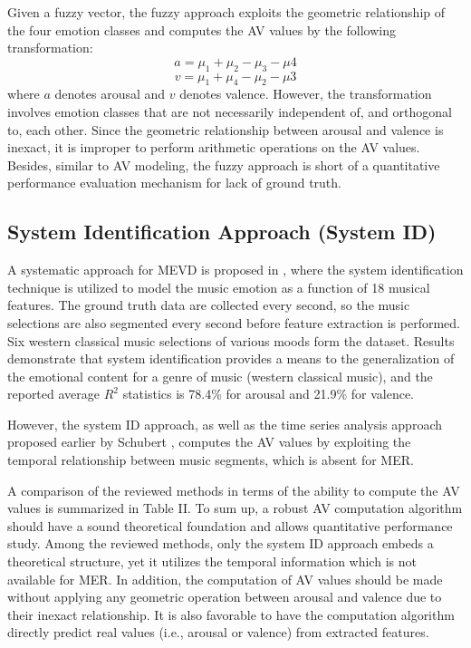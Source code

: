 \documentclass[journal, twoside]{IEEEtran}
\begin{document}
Given a fuzzy vector, the fuzzy approach exploits the geometric relationship of the four emotion classes and computes the AV values by the following transformation:
\begin{equation}
    a = \mu_1+\mu_2-\mu_3-\mu4
\end{equation}
\begin{equation}
    v = \mu_1+\mu_4-\mu_2-\mu3
\end{equation}
where $a$ denotes arousal and $v$ denotes valence. However, the transformation involves emotion classes that are not necessarily independent of, and orthogonal to, each other. Since the geometric relationship between arousal and valence is inexact, it is improper to perform arithmetic operations on the AV values. Besides, similar to AV modeling, the fuzzy approach is short of a quantitative performance evaluation mechanism for lack of ground truth.
\vspace{-1em}
\subsection{System Identification Approach (System ID)}
A systematic approach for MEVD is proposed in \cite{10},
where the system identification technique is utilized to model
the music emotion as a function of 18 musical features. The
ground truth data are collected every second, so the music
selections are also segmented every second before feature
extraction is performed. Six western classical music selections
of various moods form the dataset. Results demonstrate that
system identification provides a means to the generalization of
the emotional content for a genre of music (western classical music), and the reported average $R^2$ statistics \cite{17} is 78.4\% for arousal and 21.9\% for valence.

However, the system ID approach, as well as the time series
analysis approach proposed earlier by Schubert \cite{11}, computes
the AV values by exploiting the temporal relationship between
music segments, which is absent for MER.

A comparison of the reviewed methods in terms of the ability
to compute the AV values is summarized in Table II. To sum up,
a robust AV computation algorithm should have a sound theoretical foundation and allows quantitative performance study.
Among the reviewed methods, only the system ID approach embeds a theoretical structure, yet it utilizes the temporal information which is not available for MER. In addition, the computation of AV values should be made without applying any geometric operation between arousal and valence due to their inexact relationship. It is also favorable to have the computation algorithm directly predict real values (i.e., arousal or valence)
from extracted features.
\end{document}

